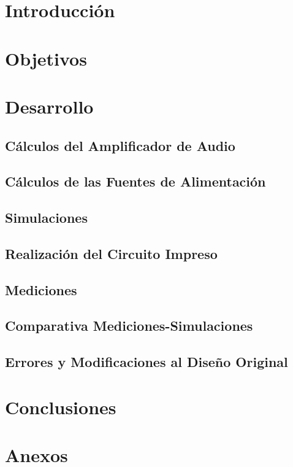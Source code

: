 \documentclass[12pt,a4paper]{article}
\begin{document}


\newpage
\thispagestyle{empty}
\tableofcontents
\newpage


\pagestyle{fancy}
\setcounter{page}{1}
\fancyfoot[R]{\thepage}



\section{Introducción}

\newpage
\section{Objetivos}

\newpage
\section{Desarrollo}

\subsection{Cálculos del Amplificador de Audio}

\subsection{Cálculos de las Fuentes de Alimentación}

\subsection{Simulaciones}

\subsection{Realización del Circuito Impreso}


\subsection{Mediciones}

\subsection{Comparativa Mediciones-Simulaciones}
\subsection{Errores y Modificaciones al Diseño Original}

\newpage
\section{Conclusiones}
\newpage
\section{Anexos}
\end{document}
